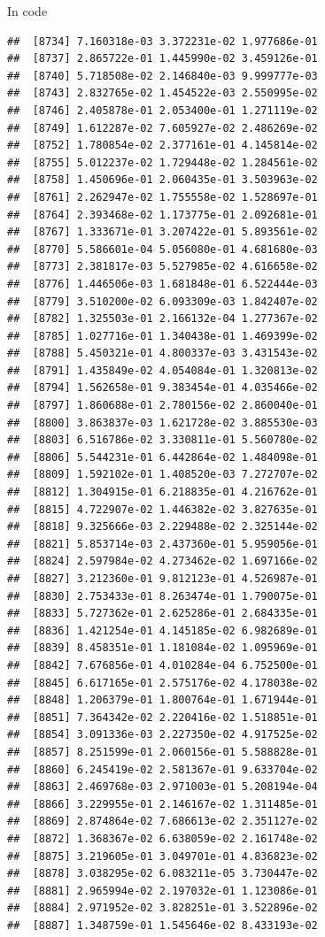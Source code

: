 \documentclass[ignorenonframetext,]{beamer}
\begin{document}
\begin{frame}[fragile]{In code}
\begin{verbatim}
##  [8734] 7.160318e-03 3.372231e-02 1.977686e-01
##  [8737] 2.865722e-01 1.445990e-02 3.459126e-01
##  [8740] 5.718508e-02 2.146840e-03 9.999777e-03
##  [8743] 2.832765e-02 1.454522e-03 2.550995e-02
##  [8746] 2.405878e-01 2.053400e-01 1.271119e-02
##  [8749] 1.612287e-02 7.605927e-02 2.486269e-02
##  [8752] 1.780854e-02 2.377161e-01 4.145814e-02
##  [8755] 5.012237e-02 1.729448e-02 1.284561e-02
##  [8758] 1.450696e-01 2.060435e-01 3.503963e-02
##  [8761] 2.262947e-02 1.755558e-02 1.528697e-01
##  [8764] 2.393468e-02 1.173775e-01 2.092681e-01
##  [8767] 1.333671e-01 3.207422e-01 5.893561e-02
##  [8770] 5.586601e-04 5.056080e-01 4.681680e-03
##  [8773] 2.381817e-03 5.527985e-02 4.616658e-02
##  [8776] 1.446506e-03 1.681848e-01 6.522444e-03
##  [8779] 3.510200e-02 6.093309e-03 1.842407e-02
##  [8782] 1.325503e-01 2.166132e-04 1.277367e-02
##  [8785] 1.027716e-01 1.340438e-01 1.469399e-02
##  [8788] 5.450321e-01 4.800337e-03 3.431543e-02
##  [8791] 1.435849e-02 4.054084e-01 1.320813e-02
##  [8794] 1.562658e-01 9.383454e-01 4.035466e-02
##  [8797] 1.860688e-01 2.780156e-02 2.860040e-01
##  [8800] 3.863837e-03 1.621728e-02 3.885530e-03
##  [8803] 6.516786e-02 3.330811e-01 5.560780e-02
##  [8806] 5.544231e-01 6.442864e-02 1.484098e-01
##  [8809] 1.592102e-01 1.408520e-03 7.272707e-02
##  [8812] 1.304915e-01 6.218835e-01 4.216762e-01
##  [8815] 4.722907e-02 1.446382e-02 3.827635e-01
##  [8818] 9.325666e-03 2.229488e-02 2.325144e-02
##  [8821] 5.853714e-03 2.437360e-01 5.959056e-01
##  [8824] 2.597984e-02 4.273462e-02 1.697166e-02
##  [8827] 3.212360e-01 9.812123e-01 4.526987e-01
##  [8830] 2.753433e-01 8.263474e-01 1.790075e-01
##  [8833] 5.727362e-01 2.625286e-01 2.684335e-01
##  [8836] 1.421254e-01 4.145185e-02 6.982689e-01
##  [8839] 8.458351e-01 1.181084e-02 1.095969e-01
##  [8842] 7.676856e-01 4.010284e-04 6.752500e-01
##  [8845] 6.617165e-01 2.575176e-02 4.178038e-02
##  [8848] 1.206379e-01 1.800764e-01 1.671944e-01
##  [8851] 7.364342e-02 2.220416e-02 1.518851e-01
##  [8854] 3.091336e-03 2.227350e-02 4.917525e-02
##  [8857] 8.251599e-01 2.060156e-01 5.588828e-01
##  [8860] 6.245419e-02 2.581367e-01 9.633704e-02
##  [8863] 2.469768e-03 2.971003e-01 5.208194e-04
##  [8866] 3.229955e-01 2.146167e-02 1.311485e-01
##  [8869] 2.874864e-02 7.686613e-02 2.351127e-02
##  [8872] 1.368367e-02 6.638059e-02 2.161748e-02
##  [8875] 3.219605e-01 3.049701e-01 4.836823e-02
##  [8878] 3.038295e-02 6.083211e-05 3.730447e-02
##  [8881] 2.965994e-02 2.197032e-01 1.123086e-01
##  [8884] 2.971952e-02 3.828251e-01 3.522896e-02
##  [8887] 1.348759e-01 1.545646e-02 8.433193e-02

\end{verbatim}
\end{frame}
\end{document}
